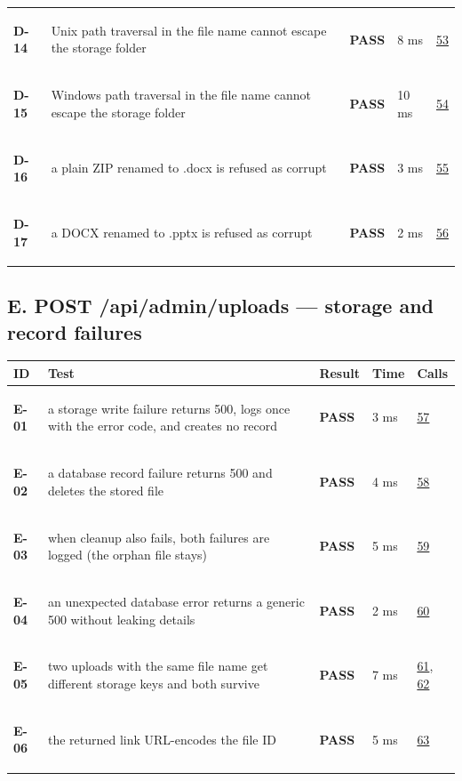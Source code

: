 \documentclass[10pt,a4paper]{article}
\begin{document}
\begin{longtable}{@{}P{1.2cm}P{9.2cm}P{1.2cm}P{1.3cm}P{2.4cm}@{}}
\hypertarget{test-D-14}{\textbf{D-14}} & Unix path traversal in the file name cannot escape the storage folder & \textcolor{passgreen}{\textbf{PASS}} & 8 ms & \hyperlink{call53}{53} \\
\hypertarget{test-D-15}{\textbf{D-15}} & Windows path traversal in the file name cannot escape the storage folder & \textcolor{passgreen}{\textbf{PASS}} & 10 ms & \hyperlink{call54}{54} \\
\hypertarget{test-D-16}{\textbf{D-16}} & a plain ZIP renamed to .docx is refused as corrupt & \textcolor{passgreen}{\textbf{PASS}} & 3 ms & \hyperlink{call55}{55} \\
\hypertarget{test-D-17}{\textbf{D-17}} & a DOCX renamed to .pptx is refused as corrupt & \textcolor{passgreen}{\textbf{PASS}} & 2 ms & \hyperlink{call56}{56} \\
\bottomrule
\end{longtable}

\subsection*{E. POST /api/admin/uploads — storage and record failures}
\begin{longtable}{@{}P{1.2cm}P{9.2cm}P{1.2cm}P{1.3cm}P{2.4cm}@{}}
\toprule \textbf{ID} & \textbf{Test} & \textbf{Result} & \textbf{Time} & \textbf{Calls} \\ \midrule \endhead
\hypertarget{test-E-01}{\textbf{E-01}} & a storage write failure returns 500, logs once with the error code, and creates no record & \textcolor{passgreen}{\textbf{PASS}} & 3 ms & \hyperlink{call57}{57} \\
\hypertarget{test-E-02}{\textbf{E-02}} & a database record failure returns 500 and deletes the stored file & \textcolor{passgreen}{\textbf{PASS}} & 4 ms & \hyperlink{call58}{58} \\
\hypertarget{test-E-03}{\textbf{E-03}} & when cleanup also fails, both failures are logged (the orphan file stays) & \textcolor{passgreen}{\textbf{PASS}} & 5 ms & \hyperlink{call59}{59} \\
\hypertarget{test-E-04}{\textbf{E-04}} & an unexpected database error returns a generic 500 without leaking details & \textcolor{passgreen}{\textbf{PASS}} & 2 ms & \hyperlink{call60}{60} \\
\hypertarget{test-E-05}{\textbf{E-05}} & two uploads with the same file name get different storage keys and both survive & \textcolor{passgreen}{\textbf{PASS}} & 7 ms & \hyperlink{call61}{61}, \hyperlink{call62}{62} \\
\hypertarget{test-E-06}{\textbf{E-06}} & the returned link URL-encodes the file ID & \textcolor{passgreen}{\textbf{PASS}} & 5 ms & \hyperlink{call63}{63} \\
\bottomrule
\end{longtable}
\end{document}
